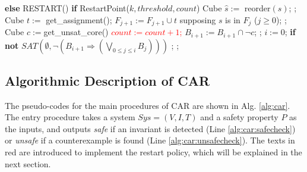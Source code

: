 \begin{algorithm}[thb]
\begin{algorithmic}[1]
            \State \textbf{else} {\color{red} RESTART()}\label{alg:car:loopend}  \label{alg:car:end}\label{alg:car:restartcall}
       \EndWhile         
\vspace{6pt}
       \label{alg:car:unsafecheckstart}
       \State \textbf{if} {\color{red}\sc RestartPoint($k,threshold, count$)}\label{alg:car:restart} 
       \State {}
       \State \qquad {}\label{alg:car:restartend} 
       \State Cube $\hat{s} := $ {\sc reorder}$(s)$;\label{alg:car:reorder} 
             ;\label{alg:car:level0} \EndIf
            \State Cube $t := $ {\sf get\_assignment()};\label{alg:car:getassignment}                 
            \State $F_{j+1} := F_{j+1} \cup t$ supposing $s$ is in $F_j$ ($j\geq 0$); 
            \label{alg:car:unsafecheckrecursive} ; \EndIf           
       \EndWhile\label{alg:backcar:unsafecheck:loop-end}
       \State Cube $c := ${\sf get\_unsat\_core()} \label{alg:car:getunsatcore}
       \State \textcolor{red}{$count := count + 1$;}\label{alg:car:countplus}
       \State $B_{i+1} := B_{i+1}\cap \neg c$;   
       \State {};
       \EndProcedure \label{alg:car:unsafecheckend}              
 \vspace{6pt}
       \label{alg:car:safecheckstart}               
       \State $i := 0$;
            \State \textbf{if} {\bf not} $SAT(\emptyset,\neg(B_{i+1}\Rightarrow(\bigvee_{0\leq j\leq i}B_j)))$
            \State \qquad {}; 
       \EndWhile
       \State {};
       \EndProcedure \label{alg:car:safecheckend}              
     \end{algorithmic}
\end{algorithm}
\subsection{Algorithmic Description of CAR}
The pseudo-codes for the main procedures of CAR are shown in Alg. \ref{alg:car}.  The entry procedure takes a system $Sys=(V,I,T)$ and a safety property $P$ as the inputs, and outputs \emph{safe} if an invariant is detected (Line \ref{alg:car:safecheck}) or \emph{unsafe} if a counterexample is found (Line \ref{alg:car:unsafecheck}). The texts in red are introduced to implement the restart policy, which will be explained in the next section. 

